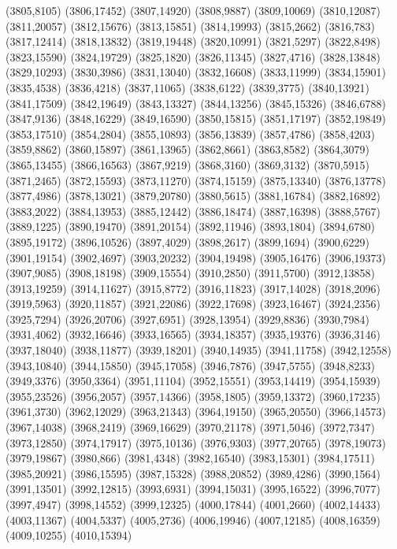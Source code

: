 (3805,8105)
(3806,17452)
(3807,14920)
(3808,9887)
(3809,10069)
(3810,12087)
(3811,20057)
(3812,15676)
(3813,15851)
(3814,19993)
(3815,2662)
(3816,783)
(3817,12414)
(3818,13832)
(3819,19448)
(3820,10991)
(3821,5297)
(3822,8498)
(3823,15590)
(3824,19729)
(3825,1820)
(3826,11345)
(3827,4716)
(3828,13848)
(3829,10293)
(3830,3986)
(3831,13040)
(3832,16608)
(3833,11999)
(3834,15901)
(3835,4538)
(3836,4218)
(3837,11065)
(3838,6122)
(3839,3775)
(3840,13921)
(3841,17509)
(3842,19649)
(3843,13327)
(3844,13256)
(3845,15326)
(3846,6788)
(3847,9136)
(3848,16229)
(3849,16590)
(3850,15815)
(3851,17197)
(3852,19849)
(3853,17510)
(3854,2804)
(3855,10893)
(3856,13839)
(3857,4786)
(3858,4203)
(3859,8862)
(3860,15897)
(3861,13965)
(3862,8661)
(3863,8582)
(3864,3079)
(3865,13455)
(3866,16563)
(3867,9219)
(3868,3160)
(3869,3132)
(3870,5915)
(3871,2465)
(3872,15593)
(3873,11270)
(3874,15159)
(3875,13340)
(3876,13778)
(3877,4986)
(3878,13021)
(3879,20780)
(3880,5615)
(3881,16784)
(3882,16892)
(3883,2022)
(3884,13953)
(3885,12442)
(3886,18474)
(3887,16398)
(3888,5767)
(3889,1225)
(3890,19470)
(3891,20154)
(3892,11946)
(3893,1804)
(3894,6780)
(3895,19172)
(3896,10526)
(3897,4029)
(3898,2617)
(3899,1694)
(3900,6229)
(3901,19154)
(3902,4697)
(3903,20232)
(3904,19498)
(3905,16476)
(3906,19373)
(3907,9085)
(3908,18198)
(3909,15554)
(3910,2850)
(3911,5700)
(3912,13858)
(3913,19259)
(3914,11627)
(3915,8772)
(3916,11823)
(3917,14028)
(3918,2096)
(3919,5963)
(3920,11857)
(3921,22086)
(3922,17698)
(3923,16467)
(3924,2356)
(3925,7294)
(3926,20706)
(3927,6951)
(3928,13954)
(3929,8836)
(3930,7984)
(3931,4062)
(3932,16646)
(3933,16565)
(3934,18357)
(3935,19376)
(3936,3146)
(3937,18040)
(3938,11877)
(3939,18201)
(3940,14935)
(3941,11758)
(3942,12558)
(3943,10840)
(3944,15850)
(3945,17058)
(3946,7876)
(3947,5755)
(3948,8233)
(3949,3376)
(3950,3364)
(3951,11104)
(3952,15551)
(3953,14419)
(3954,15939)
(3955,23526)
(3956,2057)
(3957,14366)
(3958,1805)
(3959,13372)
(3960,17235)
(3961,3730)
(3962,12029)
(3963,21343)
(3964,19150)
(3965,20550)
(3966,14573)
(3967,14038)
(3968,2419)
(3969,16629)
(3970,21178)
(3971,5046)
(3972,7347)
(3973,12850)
(3974,17917)
(3975,10136)
(3976,9303)
(3977,20765)
(3978,19073)
(3979,19867)
(3980,866)
(3981,4348)
(3982,16540)
(3983,15301)
(3984,17511)
(3985,20921)
(3986,15595)
(3987,15328)
(3988,20852)
(3989,4286)
(3990,1564)
(3991,13501)
(3992,12815)
(3993,6931)
(3994,15031)
(3995,16522)
(3996,7077)
(3997,4947)
(3998,14552)
(3999,12325)
(4000,17844)
(4001,2660)
(4002,14433)
(4003,11367)
(4004,5337)
(4005,2736)
(4006,19946)
(4007,12185)
(4008,16359)
(4009,10255)
(4010,15394)
